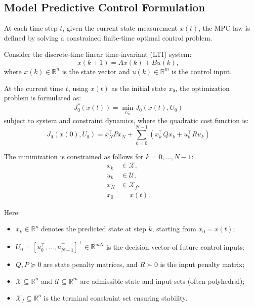 \subsection{Model Predictive Control Formulation}

At each time step $t$, given the current state measurement $x(t)$, the MPC law is defined by solving a constrained finite-time optimal control problem.

\noindent
Consider the discrete-time linear time-invariant (LTI) system:
\begin{equation}
    x(k+1) = A x(k) + B u(k),
\end{equation}
where $x(k) \in \mathbb{R}^n$ is the state vector and $u(k) \in \mathbb{R}^m$ is the control input.

\noindent
At the current time $t$, using $x(t)$ as the initial state $x_0$, the optimization problem is formulated as:
\begin{equation}
    J_0^*(x(t)) = \min_{U_0} J_0(x(t), U_0)
\end{equation}
subject to system and constraint dynamics, where the quadratic cost function is:
\begin{equation}
    J_0(x(0), U_0) = x_N^{\top} P x_N + \sum_{k=0}^{N-1} \left( x_k^{\top} Q x_k + u_k^{\top} R u_k \right)
\end{equation}

The minimization is constrained as follows for $k = 0, \dots, N-1$:
\begin{subequations}
\begin{align}
    x_k &\in \mathcal{X}, \\
    u_k &\in \mathcal{U}, \\
    x_N &\in \mathcal{X}_f, \\
    x_0 &= x(t).
\end{align}
\end{subequations}

\noindent
Here:
\begin{itemize}
    \item $x_k \in \mathbb{R}^n$ denotes the predicted state at step $k$, starting from $x_0 = x(t)$;
    \item $U_0 = [u_0^{\top}, \dots, u_{N-1}^{\top}]^{\top} \in \mathbb{R}^{mN}$ is the decision vector of future control inputs;
    \item $Q, P \succeq 0$ are state penalty matrices, and $R \succ 0$ is the input penalty matrix;
    \item $\mathcal{X} \subseteq \mathbb{R}^n$ and $\mathcal{U} \subseteq \mathbb{R}^m$ are admissible state and input sets (often polyhedral);
    \item $\mathcal{X}_f \subseteq \mathbb{R}^n$ is the terminal constraint set ensuring stability.
\end{itemize}


